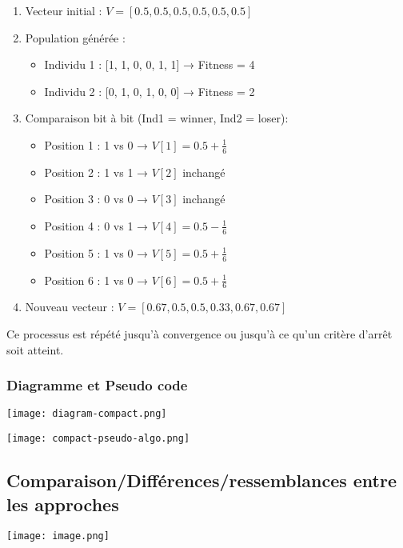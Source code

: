 \documentclass{article}
\begin{document}
\begin{enumerate}
   \item Vecteur initial : $V = [0.5, 0.5, 0.5, 0.5, 0.5, 0.5]$

   \item Population générée :
   \begin{itemize}
       \item Individu 1 : [1, 1, 0, 0, 1, 1] → Fitness = 4
       \item Individu 2 : [0, 1, 0, 1, 0, 0] → Fitness = 2
   \end{itemize}

   \item Comparaison bit à bit (Ind1 = winner, Ind2 = loser):
   \begin{itemize}
       \item Position 1 : 1 vs 0 → $V[1] = 0.5 + \frac{1}{6}$
       \item Position 2 : 1 vs 1 → $V[2]$ inchangé
       \item Position 3 : 0 vs 0 → $V[3]$ inchangé
       \item Position 4 : 0 vs 1 → $V[4] = 0.5 - \frac{1}{6}$
       \item Position 5 : 1 vs 0 → $V[5] = 0.5 + \frac{1}{6}$
       \item Position 6 : 1 vs 0 → $V[6] = 0.5 + \frac{1}{6}$
   \end{itemize}

   \item Nouveau vecteur : $V = [0.67, 0.5, 0.5, 0.33, 0.67, 0.67]$
\end{enumerate}

Ce processus est répété jusqu'à convergence ou jusqu'à ce qu'un critère d'arrêt soit atteint.

\subsubsection{Diagramme et Pseudo code}

\texttt{[image: diagram-compact.png]}

\texttt{[image: compact-pseudo-algo.png]}

\subsection{Comparaison/Différences/ressemblances entre les approches}

\texttt{[image: image.png]}
\end{document}
